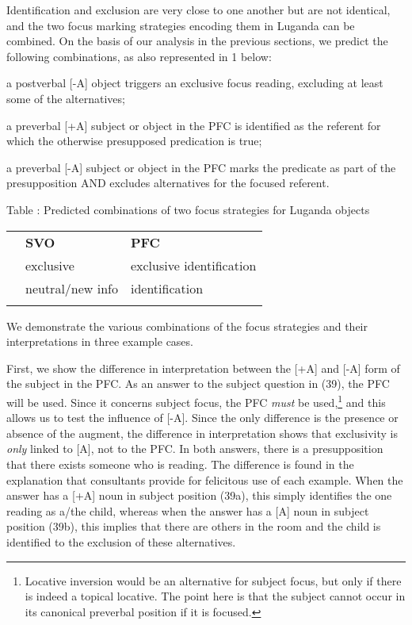 \documentclass[output=paper]{langsci/langscibook}
\begin{document}
Identification and exclusion are very close to one another but are not identical, and the two focus marking strategies encoding them in Luganda can be combined. On the basis of our analysis in the previous sections, we predict the following combinations, as also represented in 1 below:

\begin{stylelsBulletList}
a postverbal [-A] object triggers an exclusive focus reading, excluding at least some of the alternatives;
\end{stylelsBulletList}

\begin{stylelsBulletList}
a preverbal [+A] subject or object in the PFC is identified as the referent for which the otherwise presupposed predication is true;
\end{stylelsBulletList}

\begin{stylelsBulletList}
a preverbal [-A] subject or object in the PFC marks the predicate as part of the presupposition AND excludes alternatives for the focused referent.
\end{stylelsBulletList}

\begin{stylelsTableHeading}
\label{bkm:Ref311835016}Table : Predicted combinations of two focus strategies for Luganda objects
\end{stylelsTableHeading}

\begin{tabularx}{\textwidth}{XXX} & {\mdseries \textbf{SVO}} & {\mdseries \textbf{PFC}}\\
\lsptoprule
{\mdseries [-A]} & {\mdseries exclusive} & {\mdseries exclusive identification}\\
{\mdseries [+A]} & {\mdseries neutral/new info} & {\mdseries identification}\\
\lspbottomrule
\end{tabularx}
We demonstrate the various combinations of the focus strategies and their interpretations in three example cases.

  First, we show the difference in interpretation between the [+A] and [-A] form of the subject in the PFC. As an answer to the subject question in (39), the PFC will be used. Since it concerns subject focus, the PFC \textit{must} be used,\footnote{ Locative inversion would be an alternative for subject focus, but only if there is indeed a topical locative. The point here is that the subject cannot occur in its canonical preverbal position if it is focused.} and this allows us to test the influence of [-A]. Since the only difference is the presence or absence of the augment, the difference in interpretation shows that exclusivity is \textit{only} linked to [A], not to the PFC. In both answers, there is a presupposition that there exists someone who is reading. The difference is found in the explanation that consultants provide for felicitous use of each example. When the answer has a [+A] noun in subject position (39a), this simply identifies the one reading as a/the child, whereas when the answer has a [A] noun in subject position (39b), this implies that there are others in the room and the child is identified to the exclusion of these alternatives.
\end{document}
